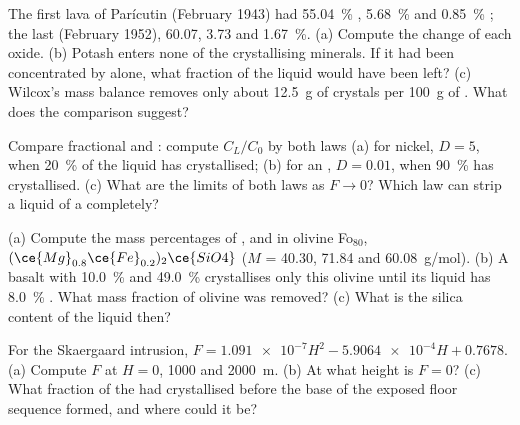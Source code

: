 \begin{exercise}[$\star$]\label{exo:b2:magmatic-differentiation:4}
The first lava of Parícutin (February 1943) had \qty{55.04}{\percent} ,
\qty{5.68}{\percent}  and \qty{0.85}{\percent} ; the last (February
1952), 60.07, 3.73 and \qty{1.67}{\percent}. (a) Compute the change of each oxide.
(b) Potash enters none of the crystallising minerals. If it had been concentrated by
 alone, what fraction of the liquid would have been left?
(c) Wilcox's mass balance removes only about \qty{12.5}{g} of crystals per
\qty{100}{g} of . What does the comparison suggest?
\end{exercise}

\begin{exercise}[$\star\star$]\label{exo:b2:magmatic-differentiation:5}
Compare fractional and : compute $C_L/C_0$ by both laws
(a) for nickel, $D = 5$, when \qty{20}{\percent} of the liquid has crystallised; (b)
for an , $D = 0.01$, when \qty{90}{\percent} has crystallised.
(c) What are the limits of both laws as $F \to 0$? Which law can strip a liquid of a
 completely?
\end{exercise}

\begin{exercise}[$\star\star$]\label{exo:b2:magmatic-differentiation:6}
(a) Compute the mass percentages of ,  and  in olivine
Fo$_{80}$, $(\ce{Mg}_{0.8}\ce{Fe}_{0.2})_2\ce{SiO4}$ ($M$ = 40.30, 71.84 and
\qty{60.08}{g/mol}). (b) A basalt with \qty{10.0}{\percent}  and
\qty{49.0}{\percent}  crystallises only this olivine until its liquid has
\qty{8.0}{\percent} . What mass fraction of olivine was removed? (c) What
is the silica content of the liquid then?
\end{exercise}

\begin{exercise}[$\star\star$]\label{exo:b2:magmatic-differentiation:7}
For the Skaergaard intrusion, $F = \num{1.091e-7}H^2 - \num{5.9064e-4}H + 0.7678$.
(a) Compute $F$ at $H = 0$, 1000 and \qty{2000}{m}. (b) At what height is $F = 0$?
(c) What fraction of the  had crystallised before the base of the exposed floor
sequence formed, and where could it be?
\end{exercise}

